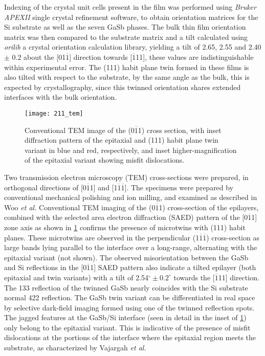 Indexing of the crystal unit cells present in the film was performed using \textit{Bruker APEXII} single crystal refinement software, to obtain orientation matrices for the Si substrate as well as the seven GaSb phases. The bulk thin film orientation matrix was then compared to the substrate matrix and a tilt calculated using \textit{orilib} a crystal orientation calculation library, yielding a tilt of 2.65\degree{}, 2.55\degree{} and 2.40\degree{} $\pm$ 0.2\degree{} about the [01$\overline{1}$] direction towards [$\overline{1}$11], these values are indistinguishable within experimental error. The (111) habit plane twin formed in these films is also tilted with respect to the substrate, by the same angle as the bulk, this is expected by crystallography, since this twinned orientation shares extended interfaces with the bulk orientation.
\begin{figure}
    \centering
\texttt{[image: 211\_tem]}
\caption[TEM of thin film on 211 silicon]{\label{fig:211_tem}Conventional TEM image of the (0$\overline{1}$1) cross section, with inset diffraction pattern of the epitaxial and (111) habit plane twin variant in blue and red, respectively, and inset higher-magnification of the epitaxial variant showing misfit dislocations.}
\end{figure}

Two transmission electron microscopy (TEM) cross-sections were prepared, in orthogonal directions of [0$\overline{1}$1] and [1$\overline{1}\overline{1}$]. The specimens were prepared by conventional mechanical polishing and ion milling, and examined as described in Woo \textit{et al.}\cite{Woo2012} Conventional TEM imaging of the (0$\overline{1}$1) cross-section of the epilayers, combined with the selected area electron diffraction (SAED) pattern of the [0$\overline{1}$1] zone axis as shown in \cref{fig:211_tem} confirms the presence of microtwins with (111) habit planes. These microtwins are observed in the perpendicular (1$\overline{1}\overline{1}$) cross-section as large bands lying parallel to the interface over a long-range, alternating with the epitaxial variant (not shown). The observed misorientation between the GaSb and Si reflections in the [0$\overline{1}$1] SAED pattern also indicate a tilted epilayer (both epitaxial and twin variants) with a tilt of 2.54$^\circ \pm 0.2^\circ$ towards the [$\overline{1}$11] direction. The 133 reflection of the twinned GaSb nearly coincides with the Si substrate normal 422 reflection. The GaSb twin variant can be differentiated in real space by selective dark-field imaging formed using one of the twinned reflection spots. The jagged features at the GaSb/Si interface (seen in detail in the inset of \cref{fig:211_tem}) only belong to the epitaxial variant. This is indicative of the presence of misfit dislocations at the portions of the interface where the epitaxial region meets the substrate, as characterized by Vajargah \textit{et al.}\cite{Vajargah2011b}

